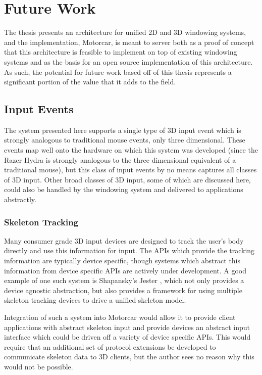\chapter{Future Work}
The thesis presents an architecture for unified 2D and 3D windowing systems, and the implementation, Motorcar, is meant to server both as a proof of concept that this architecture is feasible to implement on top of existing windowing systems and as the basis for an open source implementation of this architecture. As such, the potential for future work based off of this thesis represents a significant portion of the value that it adds to the field. 

\section{Input Events}
The system presented here supports a single type of 3D input event which is strongly analogous to traditional mouse events, only three dimensional. These events map well onto the hardware on which this system was developed (since the Razer Hydra is strongly analogous to the three dimensional equivalent of a traditional mouse), but this class of input events by no means captures all classes of 3D input. Other broad classes of 3D input, some of which are discussed here, could also be handled by the windowing system and delivered to applications abstractly.

\subsection{Skeleton Tracking}
Many consumer grade 3D input devices are designed to track the user's body directly and use this information for input. The APIs which provide the tracking information are typically device specific, though systems which abstract this information from device specific APIs are actively under development. A good example of one such system is Shapansky's Jester \cite{jester}, which not only provides a device agnostic abstraction, but also provides a framework for using multiple skeleton tracking devices to drive a unified skeleton model. 

Integration of such a system into Motorcar would allow it to provide client applications with abstract skeleton input and provide devices an abstract input interface which could be driven off a variety of device specific APIs. This would require that an additional set of protocol extensions be developed to communicate skeleton data to 3D clients, but the author sees no reason why this would not be possible. 

